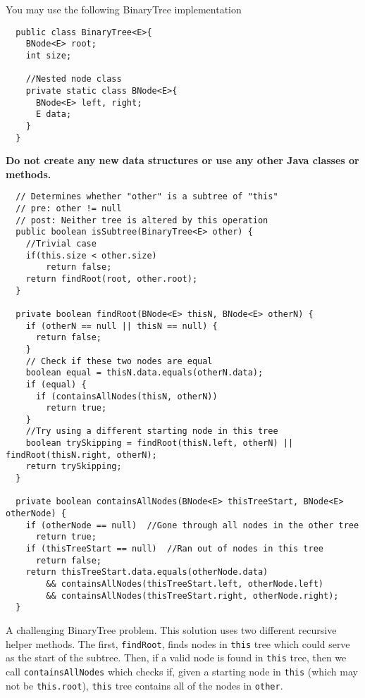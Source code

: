 \documentclass[12pt,letter]{article}
\begin{document}
\vspace{4pt}
\noindent You may use the following BinaryTree implementation

\begin{verbatim}
  public class BinaryTree<E>{
    BNode<E> root;
    int size;

    //Nested node class
    private static class BNode<E>{
      BNode<E> left, right;
      E data;
    }
  }
\end{verbatim}

\noindent \textbf{Do not create any new data structures or use any other Java classes or methods.}

\clearpage
\begin{verbatim}
  // Determines whether "other" is a subtree of "this"
  // pre: other != null
  // post: Neither tree is altered by this operation
  public boolean isSubtree(BinaryTree<E> other) {
    //Trivial case
    if(this.size < other.size)
        return false;
    return findRoot(root, other.root);
  }

  private boolean findRoot(BNode<E> thisN, BNode<E> otherN) {
    if (otherN == null || thisN == null) {
      return false;
    }
    // Check if these two nodes are equal
    boolean equal = thisN.data.equals(otherN.data);
    if (equal) {
      if (containsAllNodes(thisN, otherN))
        return true;
    }
    //Try using a different starting node in this tree
    boolean trySkipping = findRoot(thisN.left, otherN) || findRoot(thisN.right, otherN);
    return trySkipping;
  }

  private boolean containsAllNodes(BNode<E> thisTreeStart, BNode<E> otherNode) {
    if (otherNode == null)  //Gone through all nodes in the other tree
      return true;
    if (thisTreeStart == null)  //Ran out of nodes in this tree
      return false;
    return thisTreeStart.data.equals(otherNode.data) 
        && containsAllNodes(thisTreeStart.left, otherNode.left)
        && containsAllNodes(thisTreeStart.right, otherNode.right);
  }
\end{verbatim}

\noindent A challenging BinaryTree problem. This solution uses two different recursive helper methods. The first,
\texttt{findRoot}, finds nodes in \texttt{this} tree which could serve as the start of the subtree. Then, if a valid
node is found in \texttt{this} tree, then we call \texttt{containsAllNodes} which checks if, given a starting node in \texttt{this} 
(which may not be \texttt{this.root}), \texttt{this} tree contains all of the nodes in \texttt{other}. 
\end{document}
